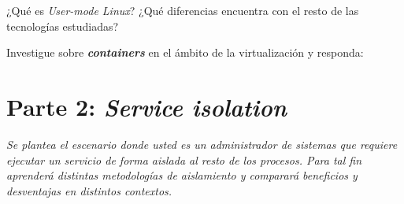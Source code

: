 \begin{questions}

  \question ¿Qué es \textit{User-mode Linux}? ¿Qué diferencias encuentra
  con el resto de las tecnologías estudiadas?

  \question Investigue sobre \textit{\textbf{containers}} en el ámbito de
  la virtualización y responda:

\end{questions}

\section{Parte 2: \textit{Service isolation}}
\textit{Se plantea el escenario donde usted es un administrador de sistemas
  que requiere ejecutar un servicio de forma aislada al resto de los
  procesos. Para tal fin aprenderá distintas metodologías de aislamiento y
  comparará beneficios y desventajas en distintos contextos.}


